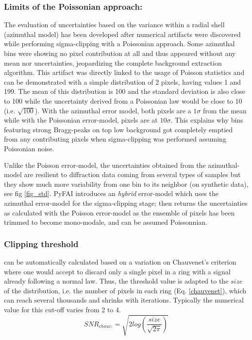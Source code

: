 \documentclass[preprint]{iucr}              %
\begin{document}
\subsubsection{Limits of the Poissonian approach:}

The evaluation of uncertainties based on the variance within a radial shell (azimuthal model) has been developed after numerical artifacts were discovered while performing sigma-clipping with a Poissonian approach. 
Some azimuthal bins were showing no pixel contribution at all and thus appeared without any mean nor uncertainties, jeopardizing the complete background extraction algorithm. 
This artifact was directly linked to the usage of Poisson statistics and can be demonstrated with a simple distribution of 2 pixels, having values 1 and 199. 
The mean of this distribution is 100 and the standard deviation is also close to 100 while the uncertainty derived from a Poissonian law would  be close to 10 (i.e. $\sqrt{100}$). 
With the azimuthal error model, both pixels are a $1\sigma$ from the mean while with the Poissonian error-model, pixels are at $10 \sigma$.  
This explains why bins featuring strong Bragg-peaks on top low background got completely emptied from any contributing pixels when sigma-clipping was performed assuming Poissonian noise.

Unlike the Poisson error-model, the uncertainties obtained from the azimuthal-model are resilient to diffraction data coming from several types of samples but they show much more variability from one bin to its neighbor (on synthetic data), see fig \ref{fig_std}. 
PyFAI introduces an \textit{hybrid} error-model which uses the azimuthal error-model for the sigma-clipping stage; then returns the uncertainties as calculated with the Poisson error-model as the ensemble of pixels has been trimmed to become mono-modale, and can be assumed Poissonnian.

\subsubsection{Clipping threshold}
can be automatically calculated based on a variation on Chauvenet's criterion \cite{chauvenet} where one would accept to discard only a single pixel in a ring with a signal already following a normal law. 
Thus, the threshold value is adapted to the $size$ of the distribution, i.e. the number of pixels in each ring (Eq. \ref{chauvenet}), which can reach several thousands and shrinks with iterations.
Typically the numerical value for this cut-off varies from 2 to 4.   
\begin{equation}
\label{chauvenet}
SNR_{chauv.} =  \sqrt{2 log(\frac{size}{\sqrt{2 \pi}})}
\end{equation}
\end{document}
